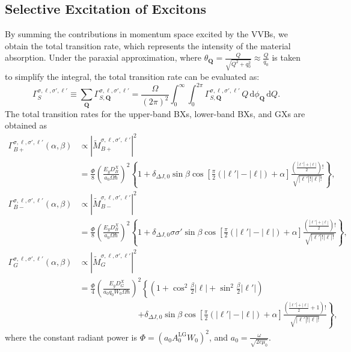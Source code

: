 \subsection{Selective Excitation of Excitons}

By summing the contributions in momentum space excited by the VVBs, we obtain the total transition rate, which represents the intensity of the material absorption. Under the paraxial approximation, where $\theta_{\boldsymbol{Q}} = \frac{Q}{\sqrt{Q^2+q_0^2}} \approx \frac{Q}{q_0}$ is taken to simplify the integral, the total transition rate can be evaluated as:
\[
\Gamma_{S}^{\sigma, \ell, \sigma', \ell'} 
\equiv 
\sum_{\boldsymbol{Q}} 
\Gamma_{S, \boldsymbol{Q}}^{\sigma, \ell, \sigma', \ell'} 
=
\frac{\Omega}{(2\pi)^2} 
\int_0^\infty \int_0^{2\pi} 
\Gamma_{S, \boldsymbol{Q}}^{\sigma, \ell, \sigma', \ell'} 
\, Q \, \mathrm{d}\phi_{\boldsymbol{Q}} \, \mathrm{d}Q.
\]
The total transition rates for the upper-band BXs, lower-band BXs, and GXs are obtained as
\begin{equation}
\begin{aligned}
\Gamma^{\sigma,\ell,\sigma',\ell'}_{B+}(\alpha,\beta)
&\propto \left|\tilde{M}^{\sigma,\ell,\sigma',\ell'}_{B+}\right|^2 \\
&= \frac{\Phi}{8} \left( \frac{E_g D^X_B}{a_0\Omega\hbar} \right)^2 
\left\{1+\delta_{\Delta J, 0}\sin\beta\cos\left[\frac{\pi}{2}(|\ell'|-|\ell|)+\alpha\right]\frac{\left(\frac{|\ell'|+|\ell|}{2}\right)!}{\sqrt{|\ell'|!|\ell|!}}\right\} , \\
\Gamma^{\sigma,\ell,\sigma',\ell'}_{B-}(\alpha,\beta) 
&\propto \left|\tilde{M}^{\sigma,\ell,\sigma',\ell'}_{B-}\right|^2 \\
&=\frac{\Phi}{8} \left( \frac{E_g D^X_B}{a_0\Omega\hbar} \right)^2 
\left\{1+\delta_{\Delta J, 0}\sigma\sigma'\sin\beta\cos\left[\frac{\pi}{2}(|\ell'|-|\ell|)+\alpha\right]\frac{\left(\frac{|\ell'|+|\ell|}{2}\right)!}{\sqrt{|\ell'|!|\ell|!}}\right\} , \\
\Gamma^{\sigma,\ell,\sigma',\ell'}_{G}(\alpha,\beta) 
&\propto \left|\tilde{M}^{\sigma,\ell,\sigma',\ell'}_{G}\right|^2 \\
&=\frac{\Phi}{4} \left( \frac{E_g D^X_G}{a_0 q_0 W_0\Omega\hbar} \right)^2 
\left\{\left(1+\cos^2\frac{\beta}{2}|\ell|+\sin^2\frac{\beta}{2}|\ell'|\right) \right. \\
&\hspace{7em} \left. + \delta_{\Delta J, 0}\sin\beta\cos\left[\frac{\pi}{2}(|\ell'|-|\ell|) +\alpha\right]\frac{\left(\frac{|\ell'|+|\ell|}{2}+1\right)!}{\sqrt{|\ell'|!|\ell|!}}\right\} ,
\end{aligned}
\label{total_transition_rate}
\end{equation}
where the constant radiant power is $\Phi = (a_0 A_0^{\mathrm{LG}} W_0)^2$, and $a_0 = \frac{\omega}{\sqrt{2c\mu_0}}$.

